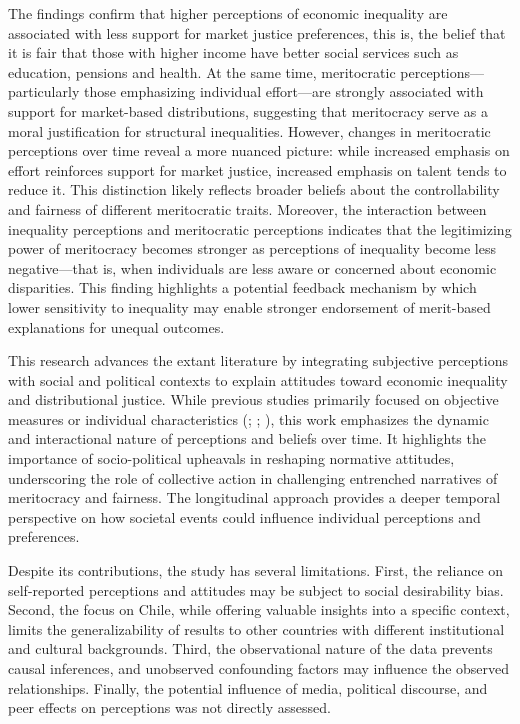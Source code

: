 \documentclass[
  12pt,
]{article}
\begin{document}
The findings confirm that higher perceptions of economic inequality are
associated with less support for market justice preferences, this is,
the belief that it is fair that those with higher income have better
social services such as education, pensions and health. At the same
time, meritocratic perceptions---particularly those emphasizing
individual effort---are strongly associated with support for
market-based distributions, suggesting that meritocracy serve as a moral
justification for structural inequalities. However, changes in
meritocratic perceptions over time reveal a more nuanced picture: while
increased emphasis on effort reinforces support for market justice,
increased emphasis on talent tends to reduce it. This distinction likely
reflects broader beliefs about the controllability and fairness of
different meritocratic traits. Moreover, the interaction between
inequality perceptions and meritocratic perceptions indicates that the
legitimizing power of meritocracy becomes stronger as perceptions of
inequality become less negative---that is, when individuals are less
aware or concerned about economic disparities. This finding highlights a
potential feedback mechanism by which lower sensitivity to inequality
may enable stronger endorsement of merit-based explanations for unequal
outcomes.

This research advances the extant literature by integrating subjective
perceptions with social and political contexts to explain attitudes
toward economic inequality and distributional justice. While previous
studies primarily focused on objective measures or individual
characteristics (;
;
), this work emphasizes the
dynamic and interactional nature of perceptions and beliefs over time.
It highlights the importance of socio-political upheavals in reshaping
normative attitudes, underscoring the role of collective action in
challenging entrenched narratives of meritocracy and fairness. The
longitudinal approach provides a deeper temporal perspective on how
societal events could influence individual perceptions and preferences.

Despite its contributions, the study has several limitations. First, the
reliance on self-reported perceptions and attitudes may be subject to
social desirability bias. Second, the focus on Chile, while offering
valuable insights into a specific context, limits the generalizability
of results to other countries with different institutional and cultural
backgrounds. Third, the observational nature of the data prevents causal
inferences, and unobserved confounding factors may influence the
observed relationships. Finally, the potential influence of media,
political discourse, and peer effects on perceptions was not directly
assessed.
\end{document}
